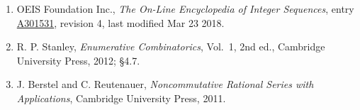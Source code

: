 \documentclass[11pt]{article}
\theoremstyle{definition}
\begin{document}
\begin{enumerate}

\item OEIS Foundation Inc., \emph{The On-Line Encyclopedia of Integer Sequences}, entry \href{https://oeis.org/A301531}{A301531}, revision 4, last modified Mar 23 2018.

\item R. P. Stanley, \emph{Enumerative Combinatorics}, Vol.~1, 2nd ed., Cambridge University Press, 2012; \S4.7.

\item J. Berstel and C. Reutenauer, \emph{Noncommutative Rational Series with Applications}, Cambridge University Press, 2011.

\end{enumerate}
\end{document}
